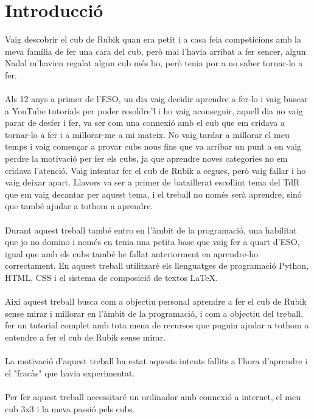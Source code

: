 \part*{Introducció}
\pagestyle{Introducció}

Vaig descobrir el cub de Rubik quan era petit i a casa feia competicions amb la meva família
de fer una cara del cub, però mai l'havia arribat a fer sencer, algun Nadal m'havien regalat algun
cub més bo, però tenia por a no saber tornar-lo a fer.
\\\\Als 12 anys a primer de l'ESO, un dia vaig decidir aprendre a fer-lo i vaig buscar a YouTube tutorials per poder resoldre'l i ho vaig aconseguir, aquell dia no vaig parar de desfer i fer, va
ser com una connexió amb el cub que em cridava a tornar-lo a fer i a millorar-me a mi mateix.
No vaig tardar a millorar el meu temps i vaig començar a provar cubs nous fins que va arribar
un punt a on vaig perdre la motivació per fer els cubs, ja que aprendre noves categories no
em cridava l'atenció. Vaig intentar fer el cub de Rubik a cegues, però vaig fallar i ho vaig deixar
apart. Llavors va ser a primer de batxillerat escollint tema del TdR que em vaig decantar per
aquest tema, i el treball no només serà aprendre, sinó que també ajudar a tothom a aprendre.
\\\\Durant aquest treball també entro en l'àmbit de la programació, una habilitat que jo no domino i només en tenia una petita base que vaig fer a quart d'ESO, igual que amb els cubs
també he fallat anteriorment en aprendre-ho correctament. En aquest treball utilitzaré els llenguatges de programació Python, HTML, CSS i el sistema de composició de textos LaTeX.
\\\\Així aquest treball busca com a objectiu personal aprendre a fer el cub de Rubik sense mirar
i millorar en l'àmbit de la programació, i com a objectiu del treball, fer un tutorial complet
amb tota mena de recursos que puguin ajudar a tothom a entendre a fer el cub de Rubik sense
mirar.
\\\\La motivació d'aquest treball ha estat aquests intents fallits a l'hora d'aprendre i el "fracàs"
que havia experimentat.
\\\\Per fer aquest treball necessitaré un ordinador amb connexió a internet, el meu cub 3x3 i
la meva passió pels cubs.




